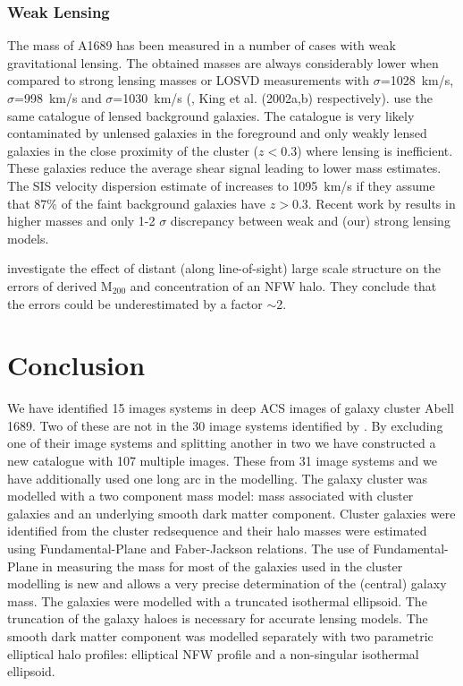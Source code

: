 \documentclass[useAMS,usenatbib]{mn2e}
\newcounter{one}   \setcounter{one}{1}
\newcounter{two}   \setcounter{two}{2}
\begin{document}
\subsubsection{Weak Lensing}
\label{sec:literature_wl}
The mass of A1689 has been measured in a number of cases with weak
gravitational lensing. The obtained masses are always considerably
lower when compared to strong lensing masses or LOSVD measurements
with $\sigma$=1028~km/s, $\sigma$=998~km/s and $\sigma$=1030~km/s
(\citet{clowe:01}, King et al. (2002a,b) respectively).
\citet{clowe:01,king:02} use the same catalogue of lensed background
galaxies. The catalogue is very likely contaminated by unlensed
galaxies in the foreground and only weakly lensed galaxies in the
close proximity of the cluster ($z<$0.3) where lensing is
inefficient. These galaxies reduce the average shear signal leading to
lower mass estimates. The SIS velocity dispersion estimate of
\citet{clowe:01} increases to 1095~km/s if they assume that 87\% of
the faint background galaxies have $z>$0.3. Recent work by
\citet{broadhurst:05b} results in higher masses and only 1-2 $\sigma$
discrepancy between weak and (our) strong lensing models.

\citet{hoekstra:03} investigate the effect of distant (along
line-of-sight) large scale structure on the errors of derived
M$_{200}$ and concentration of an NFW halo. They conclude that the
errors could be underestimated by a factor $\sim$2.


\section{Conclusion}
\label{sec:conclusion}
We have identified 15 images systems in deep ACS images of galaxy
cluster Abell 1689. Two of these are not in the 30 image systems
identified by \citet{broadhurst:05}. By excluding one of their image
systems and splitting another in two we have constructed a new
catalogue with 107 multiple images. These from 31 image systems and we
have additionally used one long arc in the modelling. The galaxy
cluster was modelled with a two component mass model: mass associated
with cluster galaxies and an underlying smooth dark matter
component. Cluster galaxies were identified from the cluster
redsequence and their halo masses were estimated using
Fundamental-Plane and Faber-Jackson relations. The use of
Fundamental-Plane in measuring the mass for most of the galaxies used
in the cluster modelling is new and allows a very precise
determination of the (central) galaxy mass. The galaxies were modelled
with a truncated isothermal ellipsoid. The truncation of the galaxy
haloes is necessary for accurate lensing models. The smooth dark
matter component was modelled separately with two parametric
elliptical halo profiles: elliptical NFW profile and a non-singular
isothermal ellipsoid.\\
\end{document}
